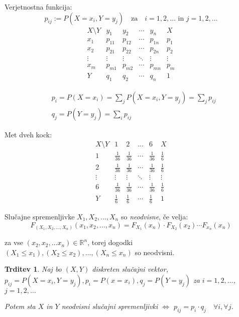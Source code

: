 \documentclass[12pt]{book}
\def\n{\noindent}
\theoremstyle{definition}
\theoremstyle{plain}
\theoremstyle{plain}
\newtheorem{trditev}{Trditev}
\theoremstyle{plain}
\theoremstyle{remark}
\begin{document}
\n Verjetnostna funkcija:
$$
p_{i j}:=P\left(X=x_i, Y=y_j\right) \quad \text{za} \quad i=1, 2, \ldots \text{ in } j=1, 2, \ldots
$$
$$
\begin{array}{c|cccc|c}
    X\setminus Y & y_1 & y_2 & \cdots & y_n & X \\
    \hline x_1 & p_{11} & p_{12} & \cdots & p_{1 n} & p_1 \\
    x_2 & p_{21} & p_{22} & \cdots & p_{2 n} & p_2 \\
    \vdots & \vdots & \vdots & \ddots & \vdots & \vdots \\
    x_m & p_{m 1} & p_{m 2} & \cdots & p_{m n} & p_m \\
    \hline Y & q_1 & q_2 & \cdots & q_n & 1
    \end{array}
$$

$$
\begin{aligned}
    &p_i=P\left(X=x_i\right)=\sum_j P\left(X=x_i, Y=y_j \right)=\sum_j p_{ij} \\
    &q_j=P\left(Y=y_j\right)=\sum_i p_{ij}
\end{aligned}
$$

\begin{zgled}
    Met dveh kock: 
    $$
    \begin{array}{c|cccc|c}
        X \setminus Y & 1 & 2 & \ldots & 6 & X \\
        \hline 1 & \frac{1}{36} & \frac{1}{36} & \cdots & \frac{1}{36} & \frac{1}{6}\\
        2 & \frac{1}{36} & \frac{1}{36} & \cdots & \frac{1}{36} & \frac{1}{6}\\
        \vdots & \vdots & \vdots & \ddots & \vdots & \vdots \\
        6 & \frac{1}{36} & \frac{1}{36} & \cdots & \frac{1}{36} & \frac{1}{6} \\
        \hline Y & \frac{1}{6} & \frac{1}{6} & \cdots & \frac{1}{6} & 1
    \end{array}
    $$
\end{zgled}

\n Slučajne spremenljivke $X_1, X_2, \ldots, X_n$ so \emph{neodvisne}, če velja: 
$$
F_{\left(X_1, X_2, \ldots, X_n\right)}\left(x_1, x_2, \ldots, x_n\right)=F_{X_1}\left(x_n\right) \cdot F_{X_2}\left(x_2\right) \cdots F_{x_n}\left(x_n\right)
$$

za vse $\left(x_2, x_2, \ldots x_n\right) \in \mathbb{R}^n$, torej dogodki $\left(X_1 \leq x_1\right),\left(X_2 \leq x_2\right), \ldots,\left(X_n \leq x_n\right)$ so neodvisni.

\begin{trditev}
    Naj bo $(X,Y)$ diskreten slučajni vektor, $p_{i j}=P\left(X=x_i, Y=y_j\right), p_i=P\left(x=x_i\right), q_j=P\left(Y=y_j\right)$ za $i=1, 2, \ldots$, $j=1, 2, \ldots$

    Potem sta $X$ in $Y$ neodvisni slučajni spremenljivki $\iff$ $p_{i j}=p_i \cdot q_j \quad \forall i, \forall j$. 
\end{trditev}
\end{document}
